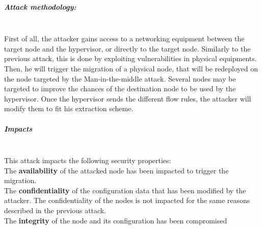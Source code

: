 \subparagraph{Attack methodology:}\textbf{\\}
First of all, the attacker gains access to a networking equipment between the target node and the hypervisor, or directly to the target node. Similarly to the previous attack, this is done by exploiting vulnerabilities in physical equipments.
Then, he will trigger the migration of a physical node, that will be redeployed on the node targeted by the Man-in-the-middle attack. Several nodes may be targeted to improve the chances of the destination node to be used by the hypervisor.
Once the hypervisor sends the different flow rules, the attacker will modify them to fit his extraction scheme.

\subparagraph{Impacts}\textbf{\\}
This attack impacts the following security properties:\\
The \textbf{availability} of the attacked node has been impacted to trigger the migration.\\
The \textbf{confidentiality} of the configuration data that has been modified by the attacker.
The confidentiality of the nodes is not impacted for the same reasons described in the previous attack.\\
The \textbf{integrity} of the node and its configuration has been compromised

% 
\newpage
